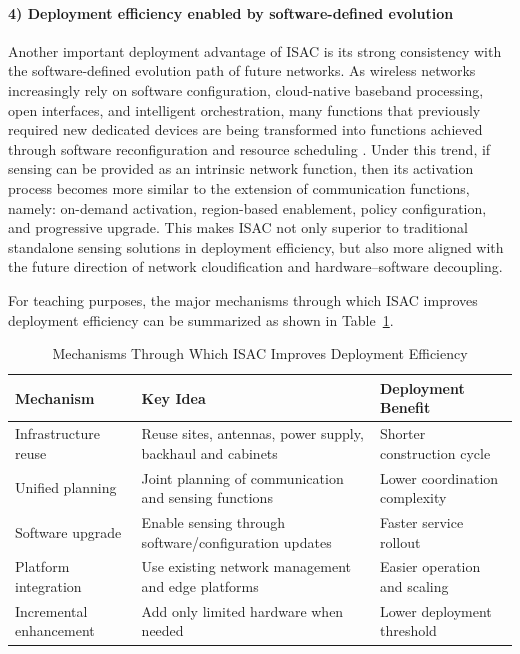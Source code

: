 \paragraph{4) Deployment efficiency enabled by software-defined evolution}
Another important deployment advantage of ISAC is its strong consistency with the software-defined evolution path of future networks. As wireless networks increasingly rely on software configuration, cloud-native baseband processing, open interfaces, and intelligent orchestration, many functions that previously required new dedicated devices are being transformed into functions achieved through software reconfiguration and resource scheduling \cite{Andrews2014,Letaief2019Roadmap}.  
Under this trend, if sensing can be provided as an intrinsic network function, then its activation process becomes more similar to the extension of communication functions, namely: on-demand activation, region-based enablement, policy configuration, and progressive upgrade. This makes ISAC not only superior to traditional standalone sensing solutions in deployment efficiency, but also more aligned with the future direction of network cloudification and hardware--software decoupling.

For teaching purposes, the major mechanisms through which ISAC improves deployment efficiency can be summarized as shown in Table~\ref{tab:isac-deployment-mechanism}.

\begin{table}[htbp]
\centering
\caption{Mechanisms Through Which ISAC Improves Deployment Efficiency}
\label{tab:isac-deployment-mechanism}
\begin{tabular}{p{3.5cm}p{5.0cm}p{4.8cm}}
\hline
\textbf{Mechanism} & \textbf{Key Idea} & \textbf{Deployment Benefit} \\
\hline
Infrastructure reuse & Reuse sites, antennas, power supply, backhaul and cabinets & Shorter construction cycle \\
Unified planning & Joint planning of communication and sensing functions & Lower coordination complexity \\
Software upgrade & Enable sensing through software/configuration updates & Faster service rollout \\
Platform integration & Use existing network management and edge platforms & Easier operation and scaling \\
Incremental enhancement & Add only limited hardware when needed & Lower deployment threshold \\
\hline
\end{tabular}
\end{table}


